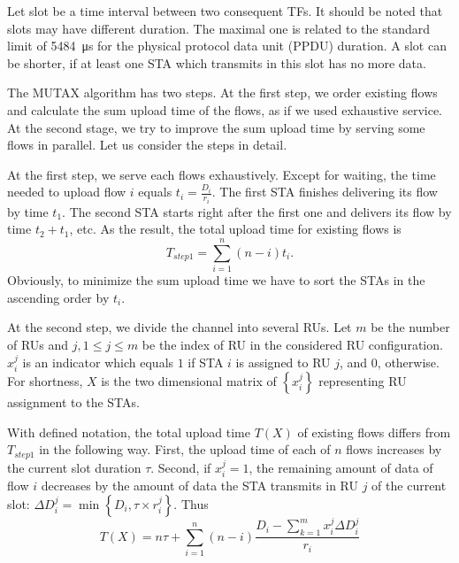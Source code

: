 Let slot be a time interval between two consequent TFs.
It should be noted that slots may have different duration. The maximal one is related to the standard limit of \SI{5484}{\us} for the physical protocol data unit (PPDU) duration. A slot can be shorter, if at least one STA which transmits in this slot has no more data.

The MUTAX algorithm has two steps. At the first step, we order existing flows and calculate the sum upload time of the flows, as if we used exhaustive service.
At the second stage, we try to improve the sum upload time by serving some flows in parallel.
Let us consider the steps in detail.

At the first step, we serve each flows exhaustively.
Except for waiting, the time needed to upload flow $i$ equals $t_i = \frac{D_i}{r_{i}}$. %
The first STA finishes delivering its flow by time $t_1$.
The second STA starts right after the first one and delivers its flow by time $t_2 + t_1$, etc.
As the result, the total upload time for existing flows is
\[ T_{step1} = \sum_{i = 1}^{n} \left(n - i\right) t_i. \]
Obviously, to minimize the sum upload time we have to sort the STAs in the ascending order by $t_i$.

At the second step, we divide the channel into several RUs.   
Let $m$ be the number of RUs and $j, 1\le j \le m$ be the index of RU in the considered RU configuration.  
$x_i^j$ is an indicator which equals $1$ if STA $i$ is assigned to RU $j$, and $0$, otherwise.
For shortness, $X$ is the two dimensional matrix of $\left\{x_i^j\right\}$ representing RU assignment to the STAs. 

With defined notation, the total upload time $T\left(X\right) $ of existing flows differs from $T_{step1}$ in the following way. First, the upload time of each of $n$ flows increases by  the current slot duration $\tau$. Second, if $x_i^j=1$, the remaining amount of data of flow $i$ decreases by the amount of data the STA transmits in RU $j$ of the current slot: $\Delta D_i^j = \min\left\{D_i, \tau \times r_{i}^{j}\right\}$. Thus  
\[ T\left(X\right) = n \tau + \sum_{i = 1}^{n} \left(n - i\right) \frac{D_i -  \sum_{k = 1}^{m} x_i^j \Delta D_i^j}{r_{i}} \]



